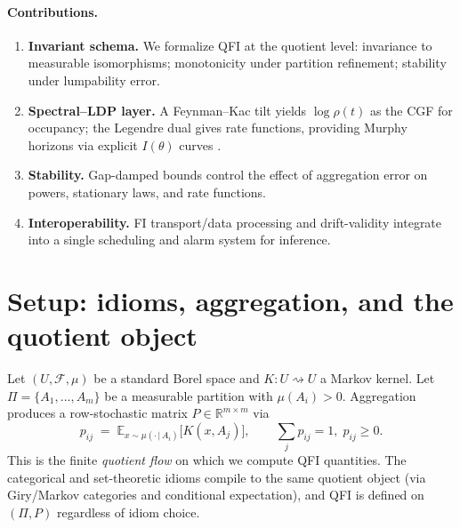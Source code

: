 \documentclass[11pt]{article}
\theoremstyle{plain}
\theoremstyle{definition}
\theoremstyle{remark}
\newcommand{\E}{\mathbb{E}}
\newcommand{\1}{\mathbbm{1}}
\begin{document}
\paragraph{Contributions.}
\begin{enumerate}
  \item \textbf{Invariant schema.} We formalize QFI at the quotient level: invariance to measurable isomorphisms; monotonicity under partition refinement; stability under lumpability error.
  \item \textbf{Spectral--LDP layer.} A Feynman--Kac tilt yields \(\log\rho(t)\) as the CGF for occupancy; the Legendre dual gives rate functions, providing Murphy horizons via explicit \(I(\theta)\) curves \parencite{DemboZeitouni1998}.
  \item \textbf{Stability.} Gap-damped bounds control the effect of aggregation error on powers, stationary laws, and rate functions.
  \item \textbf{Interoperability.} FI transport/data processing \parencite{elliott2025idiom} and drift-validity \parencite{elliott2025drift} integrate into a single scheduling and alarm system for inference.
\end{enumerate}

\section{Setup: idioms, aggregation, and the quotient object}
Let \((U,\mathcal{F},\mu)\) be a standard Borel space and \(K:U\rightsquigarrow U\) a Markov kernel. Let \(\Pi=\{A_1,\dots,A_m\}\) be a measurable partition with \(\mu(A_i)>0\). Aggregation produces a row-stochastic matrix \(P\in\mathbb{R}^{m\times m}\) via
\begin{equation}
  p_{ij}\;=\;\E_{x\sim \mu(\cdot\,|\,A_i)}\big[K(x,A_j)\big],\qquad \sum_j p_{ij}=1,\;p_{ij}\ge 0.
  \label{eq:aggregation}
\end{equation}
This is the finite \emph{quotient flow} on which we compute QFI quantities. The categorical and set-theoretic idioms compile to the same quotient object (via Giry/Markov categories and conditional expectation), and QFI is defined on \((\Pi,P)\) regardless of idiom choice.
\end{document}
